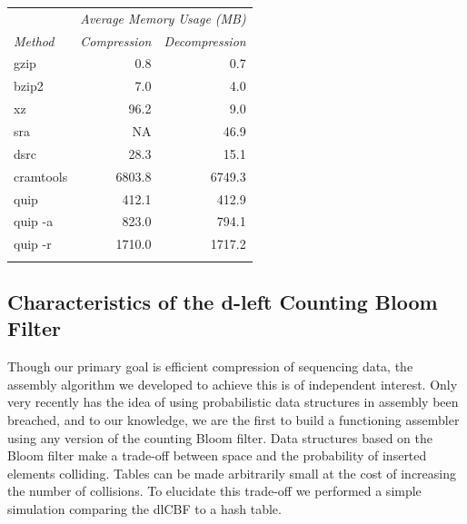 \documentclass[a4,center,fleqn]{NAR}
\begin{document}
\begin{table}
{
\begin{tabular}{@{}lrr@{}}
\toprule
                & \multicolumn{2}{c}{\textit{Average Memory Usage (MB)}} \\ \cline{2-3}
\textit{Method} & \textit{Compression} & \textit{Decompression} \\ \colrule
gzip            &     0.8              &    0.7 \\
bzip2           &     7.0              &    4.0 \\
xz              &    96.2              &    9.0 \\
sra             &      NA              &   46.9 \\
dsrc            &    28.3              &   15.1 \\
cramtools       &  6803.8              & 6749.3 \\
quip            &   412.1              &  412.9 \\
quip -a         &   823.0              &  794.1 \\
quip -r         &  1710.0              & 1717.2 \\ \botrule
\end{tabular}
}
{}
\end{table}



\subsection{Characteristics of the d-left Counting Bloom Filter}


Though our primary goal is efficient compression of sequencing data, the
assembly algorithm we developed to achieve this is of independent interest.
Only very recently has the idea of using probabilistic data structures in
assembly been breached, and to our knowledge, we are the first to build a
functioning assembler using any version of the counting Bloom filter. Data
structures based on the Bloom filter make a trade-off between space and
the probability of inserted elements colliding. Tables can be made arbitrarily
small at the cost of increasing the number of collisions. To elucidate this
trade-off we performed a simple simulation comparing the dlCBF to a hash table.
\end{document}
